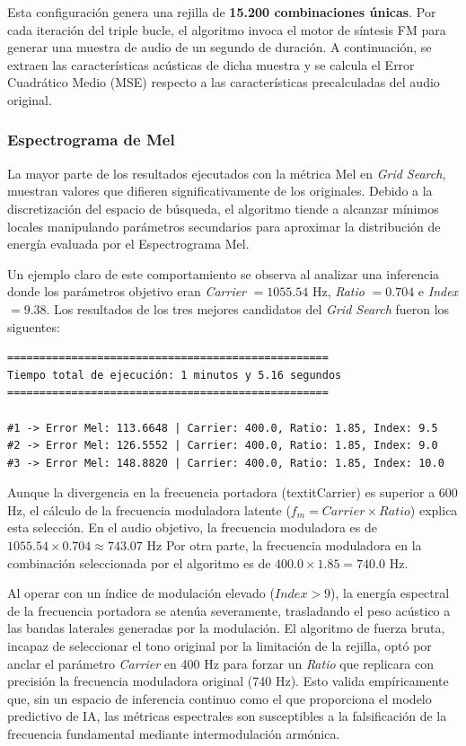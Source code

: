 \documentclass[12pt, a4paper]{article}
\begin{document}
Esta configuración genera una rejilla de \textbf{15.200 combinaciones únicas}. Por cada iteración del triple bucle, el algoritmo invoca el motor de síntesis 
FM para generar una muestra de audio de un segundo de duración. A continuación, se extraen las características acústicas de dicha muestra y se calcula el Error 
Cuadrático Medio (MSE) respecto a las características precalculadas del audio original.


\subsubsection{Espectrograma de Mel}
La mayor parte de los resultados ejecutados con la métrica Mel en \textit{Grid Search}, muestran valores que difieren
significativamente de los originales. Debido a la discretización del espacio de búsqueda, el algoritmo tiende a alcanzar mínimos locales manipulando 
parámetros secundarios para aproximar la distribución de energía evaluada por el Espectrograma Mel.

Un ejemplo claro de este comportamiento se observa al analizar una inferencia donde los parámetros objetivo eran \textit{Carrier} $= 1055.54$ Hz, 
\textit{Ratio} $= 0.704$ e \textit{Index} $= 9.38$. Los resultados de los tres mejores candidatos del \textit{Grid Search} fueron los siguentes:

\begin{verbatim}
==================================================
Tiempo total de ejecución: 1 minutos y 5.16 segundos
==================================================

#1 -> Error Mel: 113.6648 | Carrier: 400.0, Ratio: 1.85, Index: 9.5
#2 -> Error Mel: 126.5552 | Carrier: 400.0, Ratio: 1.85, Index: 9.0
#3 -> Error Mel: 148.8820 | Carrier: 400.0, Ratio: 1.85, Index: 10.0
\end{verbatim}

Aunque la divergencia en la frecuencia portadora (textit{Carrier}) es superior a 600 Hz, el cálculo de la frecuencia moduladora
latente ($f_m = Carrier \times Ratio$) explica esta selección. En el audio objetivo, la frecuencia moduladora es de $1055.54 \times 0.704 \approx 743.07$ Hz
Por otra parte, la frecuencia moduladora en la combinación seleccionada por el algoritmo es de $400.0 \times 1.85 = 740.0$ Hz.

Al operar con un índice de modulación elevado ($Index > 9$), la energía espectral de la frecuencia portadora se atenúa severamente,
trasladando el peso acústico a las bandas laterales generadas por la modulación. El algoritmo de fuerza bruta, incapaz de seleccionar el tono original por la 
limitación de la rejilla, optó por anclar el parámetro \textit{Carrier} en 400 Hz para forzar un \textit{Ratio} que replicara con precisión la frecuencia moduladora 
original (740 Hz). Esto valida empíricamente que, sin un espacio de inferencia continuo como el que proporciona el modelo predictivo de IA, las métricas espectrales 
son susceptibles a la falsificación de la frecuencia fundamental mediante intermodulación armónica.
\end{document}
